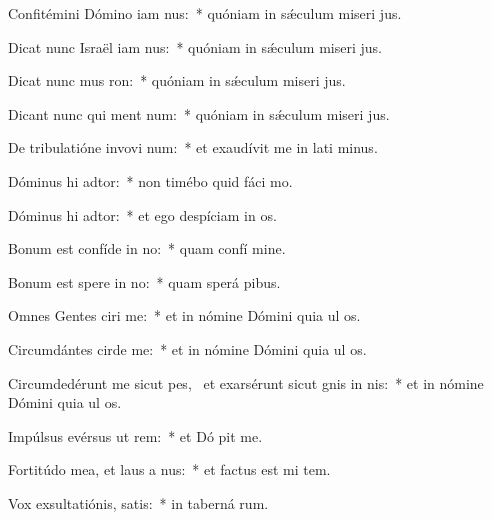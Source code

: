 \item Confitémini Dómino iam nus:~* quóniam in sǽculum miseri jus.
\item Dicat nunc Israël iam nus:~* quóniam in sǽculum miseri jus.
\item Dicat nunc mus ron:~* quóniam in sǽculum miseri jus.
\item Dicant nunc qui ment num:~* quóniam in sǽculum miseri jus.
\item De tribulatióne invovi num:~* et exaudívit me in lati minus.
\item Dóminus hi adtor:~* non timébo quid fáci  mo.
\item Dóminus hi adtor:~* et ego despíciam in os.
\item Bonum est confíde in no:~* quam confí  mine.
\item Bonum est spere in no:~* quam sperá  pibus.
\item Omnes Gentes ciri me:~* et in nómine Dómini quia ul   os.
\item Circumdántes cirde me:~* et in nómine Dómini quia ul   os.
\item Circumdedérunt me sicut pes,~\pscross{} et exarsérunt sicut gnis in nis:~* et in nómine Dómini quia ul   os.
\item Impúlsus evérsus  ut rem:~* et Dó pit me.
\item Fortitúdo mea, et laus a nus:~* et factus est mi  tem.
\item Vox exsultatiónis,  satis:~* in taberná rum.
